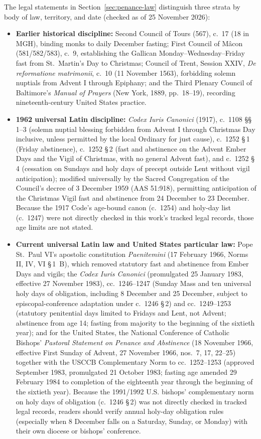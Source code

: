 The legal statements in Section~\ref{sec:penance-law} distinguish three strata
by body of law, territory, and date (checked as of 25 November 2026):

\begin{itemize}
\item \textbf{Earlier historical discipline:} Second Council of Tours (567), c.~17 (18 in MGH), binding monks to daily December fasting; First Council of M\^acon (581/582/583), c.~9, establishing the Gallican Monday--Wednesday--Friday fast from St.~Martin's Day to Christmas; Council of Trent, Session XXIV, \textit{De reformatione matrimonii}, c.~10 (11 November 1563), forbidding solemn nuptials from Advent I through Epiphany; and the Third Plenary Council of Baltimore's \textit{Manual of Prayers} (New York, 1889, pp.~18--19), recording nineteenth-century United States practice.
\item \textbf{1962 universal Latin discipline:} \textit{Codex Iuris Canonici} (1917), c.~1108 \S\S\,1--3 (solemn nuptial blessing forbidden from Advent I through Christmas Day inclusive, unless permitted by the local Ordinary for just cause), c.~1252 \S\,1 (Friday abstinence), c.~1252 \S\,2 (fast and abstinence on the Advent Ember Days and the Vigil of Christmas, with no general Advent fast), and c.~1252 \S\,4 (cessation on Sundays and holy days of precept outside Lent without vigil anticipation); modified universally by the Sacred Congregation of the Council's decree of 3 December 1959 (AAS 51:918), permitting anticipation of the Christmas Vigil fast and abstinence from 24 December to 23 December. Because the 1917 Code's age-bound canon (c.~1254) and holy-day list (c.~1247) were not directly checked in this work's tracked legal records, those age limits are not stated.
\item \textbf{Current universal Latin law and United States particular law:} Pope St.~Paul VI's apostolic constitution \textit{Paenitemini} (17 February 1966, Norms II, IV, VI \S\,1~B), which removed statutory fast and abstinence from Ember Days and vigils; the \textit{Codex Iuris Canonici} (promulgated 25 January 1983, effective 27 November 1983), cc.~1246--1247 (Sunday Mass and ten universal holy days of obligation, including 8 December and 25 December, subject to episcopal-conference adaptation under c.~1246 \S\,2) and cc.~1249--1253 (statutory penitential days limited to Fridays and Lent, not Advent; abstinence from age 14; fasting from majority to the beginning of the sixtieth year); and for the United States, the National Conference of Catholic Bishops' \textit{Pastoral Statement on Penance and Abstinence} (18 November 1966, effective First Sunday of Advent, 27 November 1966, nos.~7, 17, 22--25) together with the USCCB Complementary Norm to cc.~1252--1253 (approved September 1983, promulgated 21 October 1983; fasting age amended 29 February 1984 to completion of the eighteenth year through the beginning of the sixtieth year). Because the 1991/1992 U.S. bishops' complementary norm on holy days of obligation (c.~1246 \S\,2) was not directly checked in tracked legal records, readers should verify annual holy-day obligation rules (especially when 8 December falls on a Saturday, Sunday, or Monday) with their own diocese or bishops' conference.
\end{itemize}

